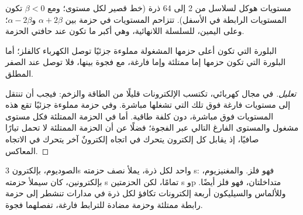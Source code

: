 \begin{omfigure}

{\small مستويات هوكل لسلاسل من 2 إلى 64 ذرة (خط قصير لكل مستوى؛
ومع $\beta < 0$ تكون المستويات الرابطة في الأسفل). تتزاحم المستويات في حزمة
بين $\alpha + 2\beta$ و$\alpha - 2\beta$؛ وعلى اليمين،  للسلسلة
اللانهائية، وهي أكبر ما تكون عند حافتي الحزمة.}
\end{omfigure}

\begin{proposition}\label{prop:b3:solid-state:filling}
البلورة التي تكون أعلى حزمها المشغولة مملوءة جزئيًا توصل الكهرباء
كالفلز؛ أما البلورة التي تكون حزمها إما ممتلئة وإما فارغة، مع فجوة
بينها، فلا توصل عند الصفر المطلق.
\end{proposition}

\begin{proof}[تعليل]
في مجال كهربائي، تكتسب الإلكترونات قليلًا من الطاقة والزخم: فيجب أن
تنتقل إلى مستويات فارغة فوق تلك التي تشغلها مباشرة. وفي حزمة مملوءة جزئيًا
تقع هذه المستويات فوق  مباشرة، دون كلفة طاقية. أما في
الحزمة الممتلئة فكل مستوى مشغول والمستوى الفارغ التالي عبر الفجوة؛
فضلًا عن أن الحزمة الممتلئة لا تحمل تيارًا صافيًا، إذ يقابل كل إلكترون يتحرك
في اتجاه إلكترونٌ آخر يتحرك في الاتجاه المعاكس.
\end{proof}

الصوديوم، بإلكترون 3s واحد لكل ذرة، يملأ نصف حزمته s: فهو فلز.
والمغنيزيوم، بإلكترونين، كان سيملأ حزمته s تمامًا، لكن الحزمتين s وp
متداخلتان، فهو فلز أيضًا. وللألماس والسيليكون أربعة إلكترونات تكافؤ
لكل ذرة في مدارات تنشطر إلى حزمة رابطة ممتلئة وحزمة
مضادة للترابط فارغة، تفصلهما فجوة.


